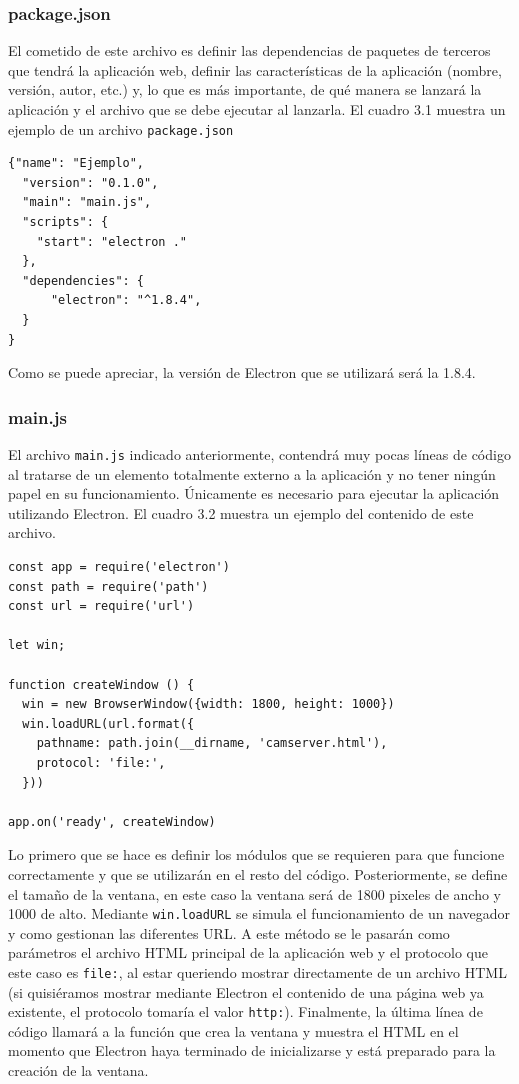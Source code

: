 \subsubsection{package.json}
El cometido de este archivo es definir las dependencias de paquetes de terceros que tendrá la aplicación web, definir las características de la aplicación (nombre, versión, autor, etc.) y, lo que es más importante, de qué manera se lanzará la aplicación y el archivo que se debe ejecutar al lanzarla. El cuadro 3.1 muestra un ejemplo de un archivo \texttt{package.json}
\begin{lstlisting}[frame=single]
{"name": "Ejemplo",
  "version": "0.1.0",
  "main": "main.js",
  "scripts": {
    "start": "electron ."
  },
  "dependencies": {
      "electron": "^1.8.4",
  }
}
\end{lstlisting}

Como se puede apreciar, la versión de Electron que se utilizará será la 1.8.4.

\subsubsection{main.js}
El archivo \texttt{main.js} indicado anteriormente, contendrá muy pocas líneas de código al tratarse de un elemento totalmente externo a la aplicación y no tener ningún papel en su funcionamiento. Únicamente es necesario para ejecutar la aplicación utilizando Electron. El cuadro 3.2 muestra un ejemplo del contenido de este archivo.

\begin{lstlisting}[frame=single]
const app = require('electron')
const path = require('path')
const url = require('url')

let win;

function createWindow () {
  win = new BrowserWindow({width: 1800, height: 1000})
  win.loadURL(url.format({
    pathname: path.join(__dirname, 'camserver.html'),
    protocol: 'file:',
  }))
  
app.on('ready', createWindow)

\end{lstlisting}

Lo primero que se hace es definir los módulos que se requieren para que funcione correctamente y que se utilizarán en el resto del código. Posteriormente, se define el tamaño de la ventana, en este caso la ventana será de 1800 pixeles de ancho y 1000 de alto. Mediante \texttt{win.loadURL} se simula el funcionamiento de un navegador y como gestionan las diferentes URL. A este método se le pasarán como parámetros el archivo HTML principal de la aplicación web y el protocolo que este caso es \texttt{file:}, al estar queriendo mostrar directamente de un archivo HTML (si quisiéramos mostrar mediante Electron el contenido de una página web ya existente, el protocolo tomaría el valor \texttt{http:}). Finalmente, la última línea de código llamará a la función que crea la ventana y muestra el HTML en el momento que Electron haya terminado de inicializarse y está preparado para la creación de la ventana.


